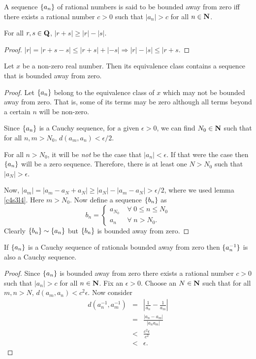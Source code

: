 \begin{defn}\label{c4s3d6}
A sequence $\{a_n\}$ of rational numbers is said to be bounded away 
from zero iff there exists a rational number $c > 0$ such that $|a_n| > c$
for all $n \in \mathbf{N}$.
\end{defn}

\begin{lem}\label{c4s3l4}
For all $r, s \in \mathbf{Q}$, $|r + s| \ge |r| - |s|$.
\end{lem}
\begin{proof}
$|r| = |r + s - s| \le |r + s| + |-s| \Rightarrow |r| - |s| \le |r + s$.
\end{proof}

\begin{lem}\label{c4s3l5}
Let $x$ be a non-zero real number. Then its equivalence class contains 
a sequence that is bounded away from zero.
\end{lem}
\begin{proof}
Let $\{a_n\}$ belong to the equivalence class of $x$ which may not be
bounded away from zero. That is, some of its terms may be zero although
all terms beyond a certain $n$ will be non-zero. 

Since $\{a_n\}$ is a Cauchy sequence, for a given $\epsilon > 0$, we
can find $N_0 \in \mathbf{N}$ such that for all $n, m > N_0$, $d(a_m, a_n) <
\epsilon/2$.

For all $n > N_0$, it will be \emph{not} be the case that $|a_n| < 
\epsilon$. If that were the case then $\{a_n\}$ will be a zero sequence.
Therefore, there is at least one $N > N_0$ such that $|a_N| > \epsilon$.

Now, $|a_m| = |a_m - a_N + a_N| \ge |a_N| - |a_m - a_N| > \epsilon/2$,
where we used lemma \ref{c4s3l4}. Here $m > N_0$. Now define a sequence
$\{b_n\}$ as
\[
b_n = \begin{cases}
 a_{N_0} & \;\forall\; 0 \le n \le N_0 \\
 a_n     & \;\forall\; n > N_0.
\end{cases}
\]
Clearly $\{b_n\} \sim \{a_n\}$ but $\{b_n\}$ is bounded away from 
zero.
\end{proof}

\begin{lem}\label{c4s3l6}
If $\{a_n\}$ is a Cauchy sequence of rationals bounded away from zero 
then $\{a_n^{-1}\}$ is also a Cauchy sequence.
\end{lem}
\begin{proof}
Since $\{a_n\}$ is bounded away from zero there exists a rational number
$c > 0$ such that $|a_n| > c$ for all $n \in \mathbf{N}$. Fix an $\epsilon > 0$.
Choose an $N \in \mathbf{N}$ such that for all $m, n > N$, $d(a_m, a_n) < c^2
\epsilon$. Now consider
\begin{eqnarray*}
d(a_n^{-1}, a_m^{-1}) &=& \left|\frac{1}{a_n} - \frac{1}{a_m}\right| \\
 &=& \frac{|a_n - a_m|}{|a_na_m|} \\
 &<& \frac{c^2\epsilon}{c^2} \\
 &<& \epsilon.
\end{eqnarray*}
\end{proof}


